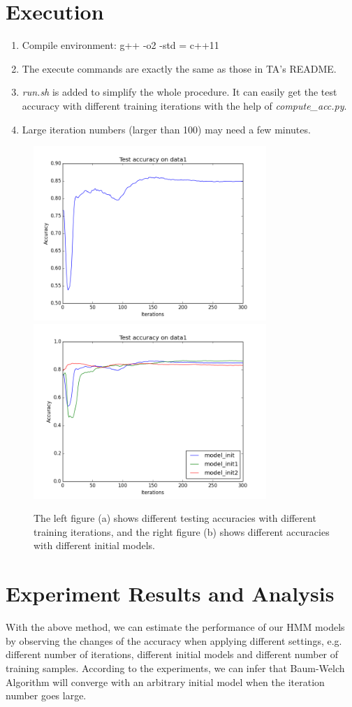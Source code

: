 \documentclass[11pt, oneside]{article}   	%
\begin{document}
\section{Execution}
\begin{enumerate}
\item Compile environment: g++ -o2 -std = c++11
\item The execute commands are exactly the same as those in TA's README.  
\item \emph{run.sh} is added to simplify the whole procedure. It can easily get the test accuracy with different training iterations with the help of \emph{compute\_acc.py}.
\item Large iteration numbers (larger than 100) may need a few minutes.
\end{enumerate}
\begin{figure}
\includegraphics[width=250pt]{exp.png}
\includegraphics[width=250pt]{exp2.png}
\caption{The left figure (a) shows different testing accuracies with different training iterations, and the right figure (b) shows different accuracies with different initial models.}
\end{figure}
\section{Experiment Results and Analysis}
With the above method, we can estimate the performance of our HMM models by observing the changes of the accuracy when applying different settings, e.g. different number of iterations, different initial models and different number of training samples. According to the experiments, we can infer that Baum-Welch Algorithm will converge with an arbitrary initial model when the iteration number goes large.
\end{document}
